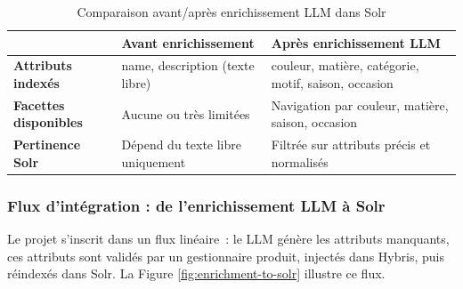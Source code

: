 \begin{table}[H]
  \centering
  \caption{Comparaison avant/après enrichissement LLM dans Solr}
  \label{tab:avant-apres-solr}
  \begin{tabular}{|p{2.5cm}|p{5.5cm}|p{5.5cm}|}
    \hline
    & \textbf{Avant enrichissement} & \textbf{Après enrichissement LLM} \\
    \hline
    \textbf{Attributs indexés} & name, description (texte libre) & couleur, matière, catégorie, motif, saison, occasion \\
    \hline
    \textbf{Facettes disponibles} & Aucune ou très limitées & Navigation par couleur, matière, saison, occasion \\
    \hline
    \textbf{Pertinence Solr} & Dépend du texte libre uniquement & Filtrée sur attributs précis et normalisés \\
    \hline
  \end{tabular}
\end{table}

\subsubsection{Flux d'intégration : de l'enrichissement LLM à Solr}
Le projet s'inscrit dans un flux linéaire~: le LLM génère les attributs manquants, ces attributs sont validés par un gestionnaire produit, injectés dans Hybris, puis réindexés dans Solr. La Figure \ref{fig:enrichment-to-solr} illustre ce flux.


